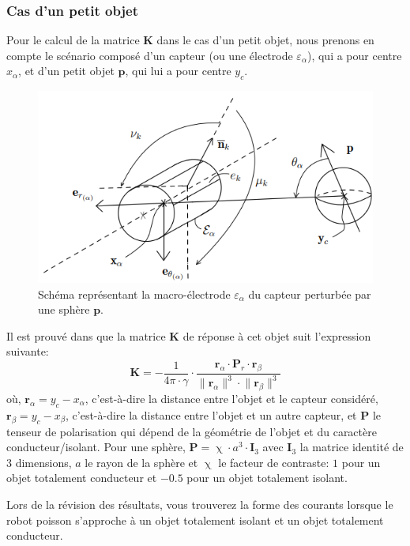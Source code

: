 \subsubsection{Cas d'un petit objet}
Pour le calcul de la matrice $\mathbf{K}$ dans le cas d'un petit objet, nous prenons en compte le scénario composé d'un capteur (ou une électrode $\varepsilon_{\alpha}$), qui a pour centre $x_\alpha$, et d'un petit objet $\mathbf{p}$, qui lui a pour centre $y_c$.
\begin{figure}[h!]
    \centering
    \includegraphics{doc/img/schema_petit_objet.png}
    \caption{Schéma représentant la macro-électrode $\varepsilon_{\alpha}$ du capteur perturbée par une sphère $\mathbf{p}$.}
    \label{fig:schema_petit_objet}
\end{figure}
Il est prouvé dans \cite{Boyer2012} que la matrice $\mathbf{K}$ de réponse à cet objet suit l'expression suivante: 
\begin{equation}
    \mathbf{K} = - \frac{1}{4\pi \cdot \gamma} \cdot \frac{\mathbf{r}_\alpha \cdot \mathbf{P}_r \cdot \mathbf{r}_\beta}{\lVert \mathbf{r}_\alpha \rVert^3 \cdot \lVert \mathbf{r}_\beta \rVert^3}
\end{equation}
où, $\mathbf{r}_\alpha = y_c - x_\alpha$, c'est-à-dire la distance entre l'objet et le capteur considéré, $\mathbf{r}_\beta = y_c - x_\beta$, c'est-à-dire la distance entre l'objet et un autre capteur, et $\mathbf{P}$ le tenseur de polarisation qui dépend de la géométrie de l'objet et du caractère conducteur/isolant. Pour une sphère, $\mathbf{P} = \upchi \cdot a^3 \cdot \mathbf{I}_{3}$ avec $\mathbf{I}_3$ la matrice identité de $3$ dimensions, $a$ le rayon de la sphère et $\upchi$ le facteur de contraste: $1$ pour un objet totalement conducteur et $-0.5$ pour un objet totalement isolant.

Lors de la révision des résultats, vous trouverez la forme des courants lorsque le robot poisson s'approche à un objet totalement isolant et un objet totalement conducteur. 

